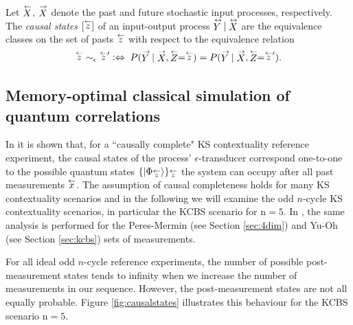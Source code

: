 \begin{definition}
Let $\oset{\leftarrow}{X}$, $\oset{\rightarrow}{X}$ denote the past and future stochastic input processes, respectively.
The \emph{causal states} $[\oset{\leftarrow}{z}]$ of an input-output process $\oset{\leftrightarrow}{Y}|\oset{\leftrightarrow}{X}$ are the equivalence classes on the set of pasts $\oset{\leftarrow}{z}$ with respect to the equivalence relation
\begin{equation*}
\oset{\leftarrow}{z}\;\sim_\epsilon\;\oset{\leftarrow}{z}'\;\mathrel{\vcentcolon\Leftrightarrow} \;P(\oset{\rightarrow}{Y}|\oset{\rightarrow}{X},\oset{\leftarrow}{Z}=\oset{\leftarrow}{z})= P(\oset{\rightarrow}{Y}|\oset{\rightarrow}{X},\oset{\leftarrow}{Z}=\oset{\leftarrow}{z}').
\end{equation*}
\end{definition}

\subsection{Memory-optimal classical simulation of quantum correlations}
In \cite{Cabello2018} it is shown that, for a ``causally complete" KS contextuality reference experiment, the causal states of the process' $\epsilon$-transducer correspond one-to-one to the possible quantum states $\{\ket{\Phi_{\oset{\leftarrow}{z}}}\}_{\oset{\leftarrow}{z}}$ the system can occupy after all past measurements $\oset{\leftarrow}{x}$. The assumption of causal completeness holds for many KS contextuality scenarios and in the following we will examine the odd $n$-cycle KS contextuality scenarios, in particular the KCBS scenario for $\text{n}=5$. In \cite{Cabello2018}, the same analysis is performed for the Peres-Mermin (see Section \ref{sec:4dim}) and Yu-Oh (see Section \ref{sec:kcbs}) sets of measurements.

For all ideal odd $n$-cycle reference experiments, the number of possible post-measurement states tends to infinity when we increase the number of measurements in our sequence. However, the post-measurement states are not all equally probable. Figure \ref{fig:causalstates} illustrates this behaviour for the KCBS scenario $\text{n}=5$.

